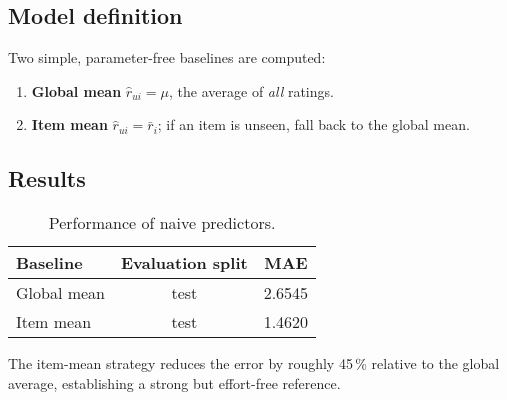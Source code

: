 \subsection*{Model definition}

Two simple, parameter-free baselines are computed:

\begin{enumerate}
  \item \textbf{Global mean}  
        \(\hat r_{ui} = \mu\), the average of \emph{all} ratings.
  \item \textbf{Item mean}  
        \(\hat r_{ui} = \bar r_{i}\); if an item is unseen, fall back to
        the global mean.
\end{enumerate}

\subsection*{Results}

\begin{table}[H]
  \centering
  \begin{tabular}{@{}lcc@{}}
    \toprule
    \textbf{Baseline} & \textbf{Evaluation split} & \textbf{MAE} \\ \midrule
    Global mean & test & 2.6545 \\
    Item mean   & test     & 1.4620 \\ \bottomrule
  \end{tabular}
  \caption{Performance of naive predictors.}
  \label{tab:naive}
\end{table}

The item-mean strategy reduces the error by roughly 45\,\% relative to the
global average, establishing a strong but effort-free reference.
